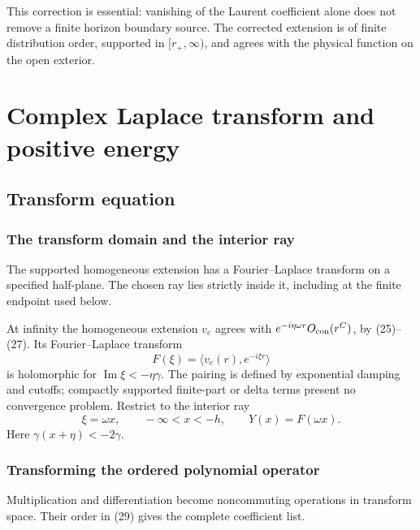 \documentclass[11pt,a4paper]{article}
\begin{document}
This correction is essential: vanishing of the Laurent coefficient alone
does not remove a finite horizon boundary source. The corrected
extension is of finite distribution order, supported in
\([r_+,\infty)\), and agrees with the physical function on the open
exterior.

\section{Complex Laplace transform and positive
energy}\label{complex-laplace-transform-and-positive-energy}

\subsection{Transform equation}\label{transform-equation}

\subsubsection{The transform domain and the interior ray}\label{readable-laplace-ray}

The supported homogeneous extension has a Fourier--Laplace transform on a specified half-plane. The chosen ray lies strictly inside it, including at the finite endpoint used below.

At infinity the homogeneous extension \(v_e\) agrees with
\(e^{-i\eta\omega r}O_{\rm con}(r^C)\), by (25)--(27). Its
Fourier--Laplace transform \[
 F(\xi)=\langle v_e(r),e^{-i\xi r}\rangle
 \tag{36}
\] is holomorphic for \(\operatorname{Im}\xi<-\eta\gamma\). The pairing
is defined by exponential damping and cutoffs; compactly supported
finite-part or delta terms present no convergence problem. Restrict to
the interior ray \[
 \xi=\omega x,\qquad -\infty<x<-h,\qquad Y(x)=F(\omega x).
 \tag{37}
\] Here \(\gamma(x+\eta)<-2\gamma\).

\subsubsection{Transforming the ordered polynomial operator}\label{readable-ordered-transform}

Multiplication and differentiation become noncommuting operations in transform space. Their order in (29) gives the complete coefficient list.
\end{document}
